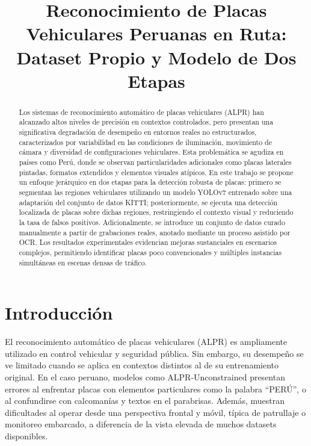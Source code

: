 \documentclass[conference]{IEEEtran}
\title{Reconocimiento de Placas Vehiculares Peruanas en Ruta: Dataset Propio y Modelo de Dos Etapas}
\author{
  \IEEEauthorblockN{Joel Ibaceta}
  \IEEEauthorblockA{
    \textit{Universidad Nacional de Ingeniería} \\
    joel.ibaceta@email.com
  }
  \and
  \IEEEauthorblockN{Segundo Autor}
  \IEEEauthorblockA{
    \textit{Nombre de su institución} \\
    segundo.autor@email.com
  }
  \and
  \IEEEauthorblockN{Tercer Autor}
  \IEEEauthorblockA{
    \textit{Otra institución} \\
    tercer.autor@email.com
  }
}
\begin{document}
\maketitle

\begin{abstract}
Los sistemas de reconocimiento automático de placas vehiculares (ALPR) han alcanzado altos niveles de precisión en contextos controlados, pero presentan una significativa degradación de desempeño en entornos reales no estructurados, caracterizados por variabilidad en las condiciones de iluminación, movimiento de cámara y diversidad de configuraciones vehiculares. Esta problemática se agudiza en países como Perú, donde se observan particularidades adicionales como placas laterales pintadas, formatos extendidos y elementos visuales atípicos. En este trabajo se propone un enfoque jerárquico en dos etapas para la detección robusta de placas: primero se segmentan las regiones vehiculares utilizando un modelo YOLOv7 entrenado sobre una adaptación del conjunto de datos KITTI; posteriormente, se ejecuta una detección localizada de placas sobre dichas regiones, restringiendo el contexto visual y reduciendo la tasa de falsos positivos. Adicionalmente, se introduce un conjunto de datos curado manualmente a partir de grabaciones reales, anotado mediante un proceso asistido por OCR. Los resultados experimentales evidencian mejoras sustanciales en escenarios complejos, permitiendo identificar placas poco convencionales y múltiples instancias simultáneas en escenas densas de tráfico.
\end{abstract}

\hspace{0.5cm}

\section{Introducción}

El reconocimiento automático de placas vehiculares (ALPR) es ampliamente utilizado en control vehicular y seguridad pública. Sin embargo, su desempeño se ve limitado cuando se aplica en contextos distintos al de su entrenamiento original. En el caso peruano, modelos como ALPR-Unconstrained presentan errores al enfrentar placas con elementos particulares como la palabra “PERÚ”, o al confundirse con calcomanías y textos en el parabrisas. Además, muestran dificultades al operar desde una perspectiva frontal y móvil, típica de patrullaje o monitoreo embarcado, a diferencia de la vista elevada de muchos datasets disponibles.
\end{document}
